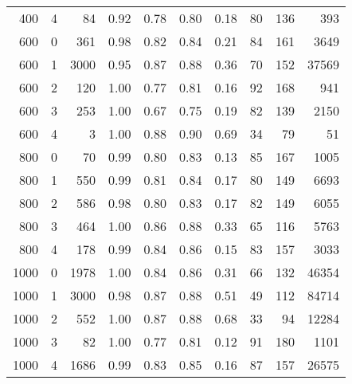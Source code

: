 \begin{tabular}{rrrrrrrrrr}
           400 &     4 &        84 &    0.92 &         0.78 &       0.80 &         0.18 &     80 &          136 &           393 \\
           600 &     0 &       361 &    0.98 &         0.82 &       0.84 &         0.21 &     84 &          161 &          3649 \\
           600 &     1 &      3000 &    0.95 &         0.87 &       0.88 &         0.36 &     70 &          152 &         37569 \\
           600 &     2 &       120 &    1.00 &         0.77 &       0.81 &         0.16 &     92 &          168 &           941 \\
           600 &     3 &       253 &    1.00 &         0.67 &       0.75 &         0.19 &     82 &          139 &          2150 \\
           600 &     4 &         3 &    1.00 &         0.88 &       0.90 &         0.69 &     34 &           79 &            51 \\
           800 &     0 &        70 &    0.99 &         0.80 &       0.83 &         0.13 &     85 &          167 &          1005 \\
           800 &     1 &       550 &    0.99 &         0.81 &       0.84 &         0.17 &     80 &          149 &          6693 \\
           800 &     2 &       586 &    0.98 &         0.80 &       0.83 &         0.17 &     82 &          149 &          6055 \\
           800 &     3 &       464 &    1.00 &         0.86 &       0.88 &         0.33 &     65 &          116 &          5763 \\
           800 &     4 &       178 &    0.99 &         0.84 &       0.86 &         0.15 &     83 &          157 &          3033 \\
          1000 &     0 &      1978 &    1.00 &         0.84 &       0.86 &         0.31 &     66 &          132 &         46354 \\
          1000 &     1 &      3000 &    0.98 &         0.87 &       0.88 &         0.51 &     49 &          112 &         84714 \\
          1000 &     2 &       552 &    1.00 &         0.87 &       0.88 &         0.68 &     33 &           94 &         12284 \\
          1000 &     3 &        82 &    1.00 &         0.77 &       0.81 &         0.12 &     91 &          180 &          1101 \\
          1000 &     4 &      1686 &    0.99 &         0.83 &       0.85 &         0.16 &     87 &          157 &         26575 \\
\bottomrule
\end{tabular}
